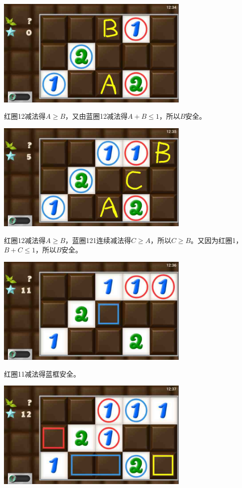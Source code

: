 \subsection{} %
\begin{center}
    \includegraphics[width=0.7\textwidth]{puzzlelow/85-1.jpg}
\end{center}
红圈12减法得$A\ge B$，又由蓝圈12减法得$A+B\le 1$，所以$B$安全。
\begin{center}
    \includegraphics[width=0.7\textwidth]{puzzlelow/85-2.jpg}
\end{center}
红圈12减法得$A\ge B$，蓝圈121连续减法得$C\ge A$，所以$C\ge B$。又因为红圈1，$B+C\le 1$，所以$B$安全。
\begin{center}
    \includegraphics[width=0.7\textwidth]{puzzlelow/85-3.jpg}
\end{center}
红圈11减法得蓝框安全。
\begin{center}
    \includegraphics[width=0.7\textwidth]{puzzlelow/85-4.jpg}
\end{center}
